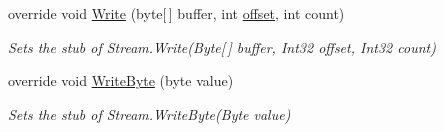 \begin{DoxyCompactItemize}
override void \hyperlink{class_system_1_1_net_1_1_security_1_1_fakes_1_1_stub_authenticated_stream_ae896838aaf227a4e91dd1431a8488c3a}{Write} (byte\mbox{[}$\,$\mbox{]} buffer, int \hyperlink{jquery-1_810_82_8js_a4a9f594d20d927164551fc7fa4751a2f}{offset}, int count)
\begin{DoxyCompactList}\small\item\em Sets the stub of Stream.\-Write(\-Byte\mbox{[}$\,$\mbox{]} buffer, Int32 offset, Int32 count)\end{DoxyCompactList}\item 
override void \hyperlink{class_system_1_1_net_1_1_security_1_1_fakes_1_1_stub_authenticated_stream_a2ace04bca96b027273829112a3a1fdf8}{Write\-Byte} (byte value)
\begin{DoxyCompactList}\small\item\em Sets the stub of Stream.\-Write\-Byte(\-Byte value)\end{DoxyCompactList}\end{DoxyCompactItemize}
